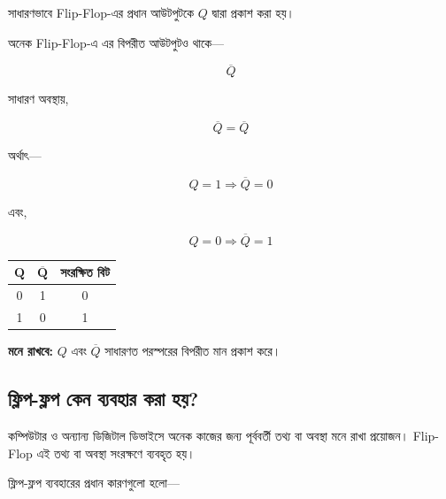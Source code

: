 সাধারণভাবে \textenglish{Flip-Flop}-এর প্রধান আউটপুটকে \(Q\)
দ্বারা প্রকাশ করা হয়।

অনেক \textenglish{Flip-Flop}-এ এর বিপরীত আউটপুটও থাকে—

\[
\overline{Q}
\]

সাধারণ অবস্থায়,

\[
\overline{Q}=\overline{Q}
\]

অর্থাৎ—

\[
Q=1
\Rightarrow
\overline{Q}=0
\]

এবং,

\[
Q=0
\Rightarrow
\overline{Q}=1
\]

\begin{center}
\renewcommand{\arraystretch}{1.2}
\begin{tabular}{|c|c|c|}
\hline
\rowcolor{ICTLightBlue}
\(\boldsymbol{Q}\)
&
\(\boldsymbol{\overline{Q}}\)
&
\textbf{সংরক্ষিত বিট}
\\
\hline
0 & 1 & 0 \\
\hline
1 & 0 & 1 \\
\hline
\end{tabular}
\end{center}

\par\begingroup

\textbf{মনে রাখবে:}
\(Q\) এবং \(\overline{Q}\) সাধারণত পরস্পরের বিপরীত মান প্রকাশ করে।
\par\endgroup




\subsection{ফ্লিপ-ফ্লপ কেন ব্যবহার করা হয়?}

কম্পিউটার ও অন্যান্য ডিজিটাল ডিভাইসে অনেক কাজের জন্য পূর্ববর্তী তথ্য
বা অবস্থা মনে রাখা প্রয়োজন। \textenglish{Flip-Flop} এই তথ্য বা অবস্থা
সংরক্ষণে ব্যবহৃত হয়।

ফ্লিপ-ফ্লপ ব্যবহারের প্রধান কারণগুলো হলো—

